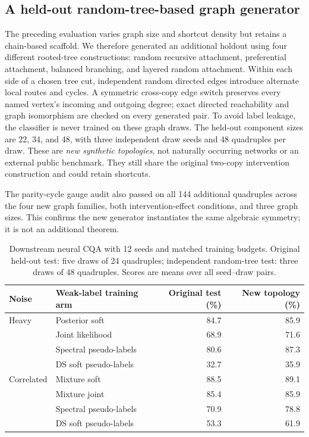\documentclass[10pt]{article}
\begin{document}
\subsection{A held-out random-tree-based graph generator}
The preceding evaluation varies graph size and shortcut density but retains a chain-based scaffold. We therefore generated an additional holdout using four different rooted-tree constructions: random recursive attachment, preferential attachment, balanced branching, and layered random attachment. Within each side of a chosen tree cut, independent random directed edges introduce alternate local routes and cycles. A symmetric cross-copy edge switch preserves every named vertex's incoming and outgoing degree; exact directed reachability and graph isomorphism are checked on every generated pair. To avoid label leakage, the classifier is never trained on these graph draws. The held-out component sizes are 22, 34, and 48, with three independent draw seeds and 48 quadruples per draw. These are \emph{new synthetic topologies}, not naturally occurring networks or an external public benchmark. They still share the original two-copy intervention construction and could retain shortcuts.

The parity-cycle gauge audit also passed on all 144 additional quadruples across the four new graph families, both intervention-effect conditions, and three graph sizes. This confirms the new generator instantiates the same algebraic symmetry; it is not an additional theorem.

\begin{table}[H]
\centering\small
\caption{Downstream neural CQA with 12 seeds and matched training budgets. Original held-out test: five draws of 24 quadruples; independent random-tree test: three draws of 48 quadruples. Scores are means over all seed--draw pairs.}
\label{tab:toposhift}
\begin{tabular}{llrr}
\toprule
Noise & Weak-label training arm & Original test (\%) & New topology (\%) \\
\midrule
Heavy & Posterior soft & 84.7 & 85.9 \\
 & Joint likelihood & 68.9 & 71.6 \\
 & Spectral pseudo-labels & 80.6 & 87.3 \\
 & DS soft pseudo-labels & 32.7 & 35.9 \\
Correlated & Mixture soft & 88.5 & 89.1 \\
 & Mixture joint & 85.4 & 85.9 \\
 & Spectral pseudo-labels & 70.9 & 78.8 \\
 & DS soft pseudo-labels & 53.3 & 61.9 \\
\bottomrule
\end{tabular}
\end{table}
\end{document}
